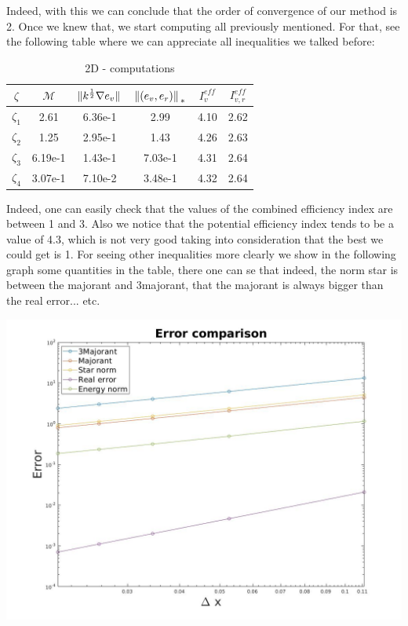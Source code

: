 \documentclass{article}
\begin{document}
	Indeed, with this we can conclude that the order of convergence of our method is 2. Once we knew that, we start computing all previously mentioned. For that, see the following table where we can appreciate all inequalities we talked before:
	\begin{table}[h!]
		\centering
		\begin{tabular}{c | c | c | c | c | c }
			$\zeta$ & $\mathcal{M}$  & $\norm*{k^{\frac{1}{2}}\nabla e_v}$ & $\norm*{(e_v,e_r)}_{*}$ & $I_v^{eff}$ & $I_{v,r}^{eff}$ \\
			\hline \hline
			$\zeta_1$ & 2.61 & 6.36e-1 & 2.99 & 4.10 & 2.62 \\ 
			$\zeta_2$ & 1.25 & 2.95e-1 & 1.43 & 4.26 & 2.63 \\
			$\zeta_3$ & 6.19e-1 & 1.43e-1& 7.03e-1 & 4.31 & 2.64 \\
			$\zeta_4$ & 3.07e-1 & 7.10e-2 & 3.48e-1 & 4.32 & 2.64 \\
		\end{tabular}
		\caption{2D - computations}
	\end{table}
	
	Indeed, one can easily check that the values of the combined efficiency index are between 1 and 3. Also we notice that the potential efficiency index tends to be a value of 4.3, which is not very good taking into consideration that the best we could get is 1. 
	For seeing other inequalities more clearly we show in the following graph some quantities in the table, there one can se that indeed, the norm star is between the majorant and 3majorant, that the majorant is always bigger than the real error... etc.
	\begin{center}
		\includegraphics[width = 0.7\linewidth]{../Images/errorcomparison2d.jpg}
	\end{center}
	
	
	
\end{document}
